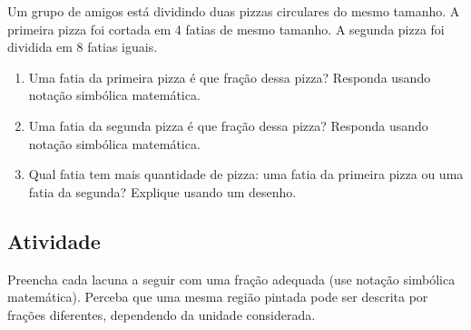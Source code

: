 Um grupo de amigos está dividindo duas pizzas circulares do mesmo tamanho. A primeira pizza foi cortada em 4 fatias de mesmo tamanho. A segunda pizza foi dividida em 8 fatias iguais.

\begin{enumerate} [\quad a)] %
  \item     Uma fatia da primeira pizza é que fração dessa pizza? Responda usando notação simbólica matemática.
  \item     Uma fatia da segunda pizza é que fração dessa pizza? Responda usando notação simbólica matemática.
  \item     Qual fatia tem mais quantidade de pizza: uma fatia da primeira pizza ou uma fatia da segunda? Explique usando um desenho.
\end{enumerate} %

\subsection{Atividade}

Preencha cada lacuna a seguir com uma fração adequada (use notação simbólica matemática). Perceba que uma mesma região pintada pode ser descrita por frações diferentes, dependendo da unidade considerada.

\def \tripinha{ (30:4) -- (90:4) -- (150:4)--(210:4)--(270:4)--(330:4) [shift={({4*sqrt(3)},0)}] --(270:4) -- (330:4) -- (30:4) -- (90:4)--(150:4)--cycle;}
\def \tripa{ (30:4) -- (90:4) -- (150:4)--(210:4)--(270:4)--(330:4) [shift={({4*sqrt(3)},0)}] --(270:4) -- (330:4) [shift={({4*sqrt(3)},0)}]--  (270:4) -- (330:4) -- (30:4) -- (90:4)--(150:4) [shift={({-4*sqrt(3)},0)}] -- (90:4) -- (150:4)--cycle;}

